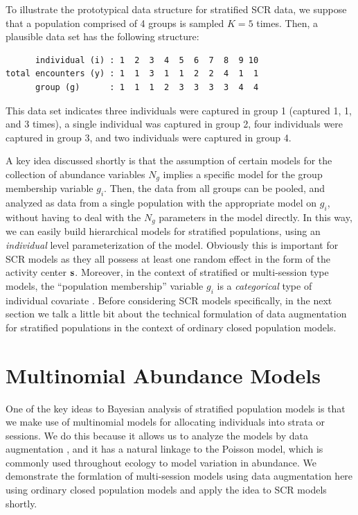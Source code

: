 To illustrate the prototypical data structure for stratified SCR data,
we suppose that a population comprised of 4 groups is sampled 
$K=5$ times. Then, a plausible data set has the following structure:
\begin{verbatim}
      individual (i) : 1  2  3  4  5  6  7  8  9 10  
total encounters (y) : 1  1  3  1  1  2  2  4  1  1
      group (g)      : 1  1  1  2  3  3  3  3  4  4
\end{verbatim}
This data set indicates three individuals were captured in
group 1 (captured 1, 1, and 3 times), a single individual was
captured in group 2, four individuals were captured in group
3, and two individuals were captured in group 4.

A key idea discussed shortly is that the assumption of certain models
for the collection of abundance variables $N_{g}$ implies a specific
model for the group membership variable $g_{i}$.  Then, the data from
all groups can be pooled, and analyzed as data from a single
population with the appropriate model on $g_{i}$, without having to
deal with the $N_{g}$ parameters in the model directly. In this way,
we can easily build hierarchical models for stratified populations,
using an {\it individual} level parameterization of the
model. Obviously this is important for SCR models as they all possess
at least one random effect in the form of the activity center ${\bf
  s}$. Moreover, in the context of stratified or multi-session type
models, the ``population membership'' variable $g_{i}$ is a {\it
  categorical} type of individual covariate \citep{huggins:1989,
  alho:1990, royle:2009}.  Before considering SCR models specifically,
in the next section we talk a little bit about the technical
formulation of data augmentation for stratified populations in the
context of ordinary closed population models.


\section{Multinomial Abundance Models}

One of the key ideas to Bayesian analysis of stratified population
models is that we make use of multinomial models for allocating
individuals into strata or sessions. We do this because it allows us
to analyze the models by data augmentation \citep{converse_royle:2012,
  royle_converse:2013}, and it has a natural linkage to the Poisson
model, which is commonly used throughout ecology to model variation in
abundance. We demonstrate the formlation of multi-session models using
data augmentation here using ordinary closed population models and
apply the idea to SCR models shortly.

